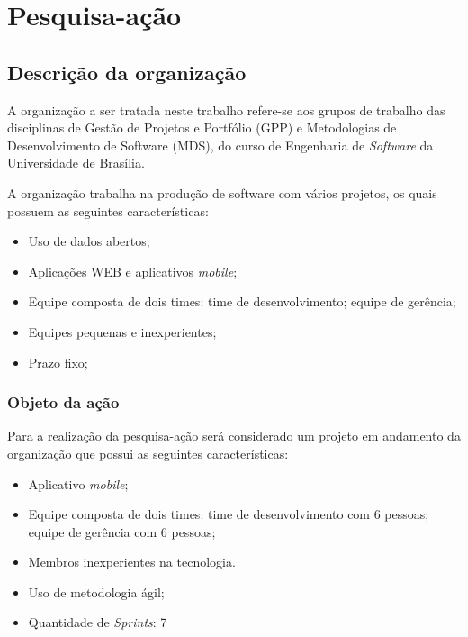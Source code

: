 \chapter{Pesquisa-ação}
\label{pesquisa_acao}
	\section{Descrição da organização}

		A organização a ser tratada neste trabalho refere-se aos grupos de trabalho das disciplinas de Gestão de Projetos
		e Portfólio (GPP) e Metodologias de Desenvolvimento de Software (MDS), do curso de Engenharia de \textit{Software}
		da Universidade de Brasília.

		A organização trabalha na produção de software com vários projetos, os quais possuem as seguintes características:

		\begin{itemize}
			\item Uso de dados abertos;
			\item Aplicações WEB e aplicativos \textit{mobile};
			\item Equipe composta de dois times:
				 time de desenvolvimento;
				 equipe de gerência;
			\item Equipes pequenas e inexperientes;
			\item Prazo fixo;
		\end{itemize}

		\subsection{Objeto da ação}

		Para a realização da pesquisa-ação será considerado um projeto em andamento da organização que possui as seguintes características:


		\begin{itemize}
			\item Aplicativo \textit{mobile};
			\item Equipe composta de dois times:
				 time de desenvolvimento com 6 pessoas;
				 equipe de gerência com 6 pessoas;
			\item Membros inexperientes na tecnologia.
			\item Uso de metodologia ágil;
			\item Quantidade de \textit{Sprints}: 7
		\end{itemize}



